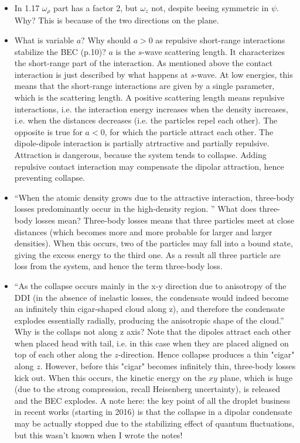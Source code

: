 \begin{itemize}
        
        \item In 1.17 $\omega_{\rho}$ part has a factor 2, but $\omega_{z}$ not, despite beeing symmetric in $\psi$. Why?{\color{red} This is because of the two directions on the plane.}
        \item What is variable $a$? Why should $a > 0$ as repulsive short-range interactions stabilize the BEC (p.10)?
        {\color{red} $a$ is the $s$-wave scattering length. It characterizes the short-range part of the interaction. As mentioned above the contact interaction is just described by what happens at $s$-wave. 
        At low energies, this means that the short-range interactions are given by a single parameter, which is the scattering length. A positive scattering length means repulsive interactions, i.e. the interaction energy increases when the density increases, i.e. when the distances decreases (i.e. the particles repel each other). The opposite is true for $a<0$, for which the particle attract each other. The dipole-dipole interaction is partially atrtractive and partially repulsive. Attraction is dangerous, because the system tends to collapse. Adding repulsive contact interaction may compensate the dipolar attraction, hence preventing collapse.} 
                \item ``When the atomic density grows due to the attractive interaction, three-body losses predominantly occur in the high-density region. '' What does three-body losses mean? 
                {\color{red} Three-body losses means that three particles meet at close distances (which becomes more and more probable for larger and larger densities). When this occurs, two of the particles may 
                fall into a bound state, giving the excess energy to the third one. As a result all three particle are loss from the system, and hence the term three-body loss.}
                 \item ``As the collapse occurs mainly in the x-y direction due to anisotropy of the DDI (in the absence of inelastic losses, the condensate would indeed become an infinitely thin cigar-shaped cloud along z),
        and therefore the condensate explodes essentially radially, producing the anisotropic
        shape of the cloud.'' Why is the collaps not along z axis?
        {\color{red} Note that the dipoles attract each other when placed head with tail, i.e. in this case when they are placed aligned on top of each other along the $z$-direction. Hence collapse produces a thin "cigar" along $z$. However, before this "cigar" becomes infinitely thin, three-body losses kick out. When this occurs, the kinetic energy on the $xy$ plane, which is huge (due to the strong compression, recall Heisenberg uncertainty), is released and the BEC explodes. A note here: the key point of all the droplet business in recent works (starting in 2016) is that the collapse in a dipolar condensate may be actually stopped due to 
        the stabilizing effect of quantum fluctuations, but this wasn't known when I wrote the notes!}
        

\end{itemize}
